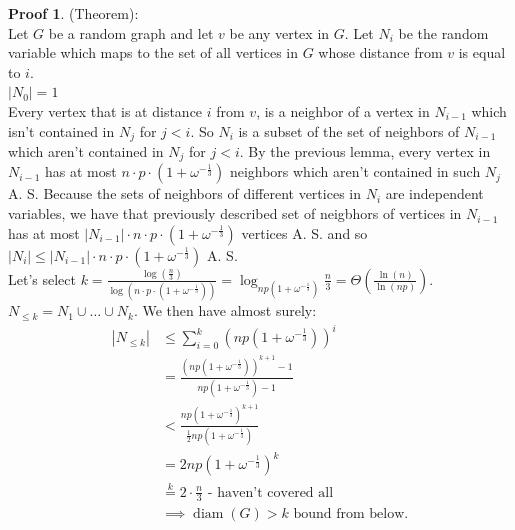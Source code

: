 \documentclass[a4paper, 12pt]{book}
\theoremstyle{definition}
\newtheorem{pro}[counter]{Proof}
\theoremstyle{remark}
\DeclareMathOperator{\diam}{diam}
\begin{document}
\begin{pro}(Theorem): \\
  Let $G$ be a random graph and let $v$ be any vertex in $G$. Let $N_i$ be the random variable which maps to the set of all vertices in $G$ whose distance from $v$ is equal to $i$.\\
  $|N_0| = 1$ \\
  Every vertex that is at distance $i$ from $v$, is a neighbor of a vertex in $N_{i-1}$ which isn't contained in $N_j$ for $j < i$. So $N_i$ is a subset of the set of neighbors of $N_{i-1}$ which aren't contained in $N_j$ for $j < i$. 
  By the previous lemma, every vertex in $N_{i-1}$ has at most $n \cdot p \cdot (1+\omega^{-\frac{1}{3}})$ neighbors which aren't contained in such $N_j$ A. S. Because the sets of neighbors of different vertices in $N_i$ are independent variables, we have 
  that previously described set of neigbhors of vertices in $N_{i-1}$ has at most $|N_{i-1}| \cdot n \cdot p \cdot (1+\omega^{-\frac{1}{3}})$ vertices A. S. and so $|N_i| \leq |N_{i-1}| \cdot n \cdot p \cdot (1+\omega^{-\frac{1}{3}})$ A. S. \\
  Let's select $k = \frac{\log \left(\frac{n}{3}\right)}{\log \left(n \cdot p \cdot \left(1+\omega^{-\frac{1}{3}}\right)\right)}
  = \log_{np(1+\omega^{-\frac{1}{3}})} \frac{n}{3} = \Theta\left(\frac{\ln(n)}{\ln(np)}\right)$. \\
  $N_{\leq k} = N_1 \cup \dots \cup N_k$. We then have almost surely:
  \begin{align*}
    |N_{\leq k}| &\leq \sum_{i=0}^{k} (np(1+\omega^{-\frac{1}{3}}))^i \\
    &= \frac{(np(1+\omega^{-\frac{1}{3}}))^{k+1}-1}{np(1+\omega^{-\frac{1}{3}}) - 1} \\
    &< \frac{np(1+\omega^{-\frac{1}{3}})^{k+1}}{\frac{1}{2} np(1+\omega^{-\frac{1}{3}})} \\
    &= 2 np(1+\omega^{-\frac{1}{3}})^k \\
    &\stackrel{k}{=} 2 \cdot \frac{n}{3} \text{ - haven't covered all} \\
    &\implies \diam(G) > k \text{ bound from below}.
  \end{align*}




\end{pro}
\end{document}
